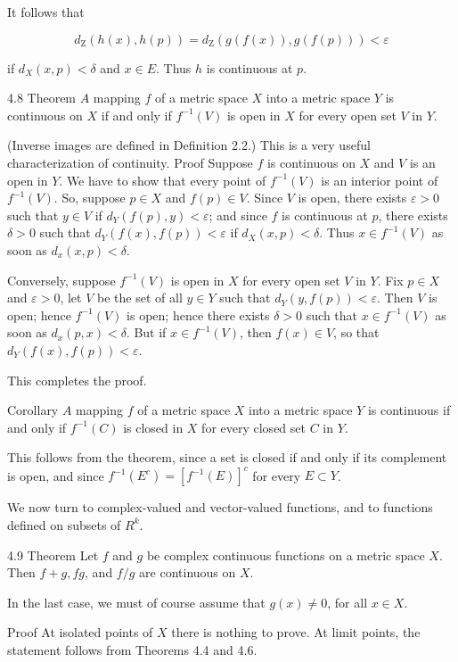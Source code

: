 \documentclass[10pt]{article}
\begin{document}
It follows that

$$
d_{\mathrm{Z}}(h(x), h(p))=d_{\mathrm{Z}}(g(f(x)), g(f(p)))<\varepsilon
$$

if $d_{X}(x, p)<\delta$ and $x \in E$. Thus $h$ is continuous at $p$.

4.8 Theorem $A$ mapping $f$ of a metric space $X$ into a metric space $Y$ is continuous on $X$ if and only if $f^{-1}(V)$ is open in $X$ for every open set $V$ in $Y$.

(Inverse images are defined in Definition 2.2.) This is a very useful characterization of continuity. Proof Suppose $f$ is continuous on $X$ and $V$ is an open in $Y$. We have to show that every point of $f^{-1}(V)$ is an interior point of $f^{-1}(V)$. So, suppose $p \in X$ and $f(p) \in V$. Since $V$ is open, there exists $\varepsilon>0$ such that $y \in V$ if $d_{Y}(f(p), y)<\varepsilon$; and since $f$ is continuous at $p$, there exists $\delta>0$ such that $d_{Y}(f(x), f(p))<\varepsilon$ if $d_{X}(x, p)<\delta$. Thus $x \in f^{-1}(V)$ as soon as $d_{x}(x, p)<\delta$.

Conversely, suppose $f^{-1}(V)$ is open in $X$ for every open set $V$ in $Y$. Fix $p \in X$ and $\varepsilon>0$, let $V$ be the set of all $y \in Y$ such that $d_{Y}(y, f(p))<\varepsilon$. Then $V$ is open; hence $f^{-1}(V)$ is open; hence there exists $\delta>0$ such that $x \in f^{-1}(V)$ as soon as $d_{x}(p, x)<\delta$. But if $x \in f^{-1}(V)$, then $f(x) \in V$, so that $d_{Y}(f(x), f(p))<\varepsilon$.

This completes the proof.

Corollary $A$ mapping $f$ of a metric space $X$ into a metric space $Y$ is continuous if and only if $f^{-1}(C)$ is closed in $X$ for every closed set $C$ in $Y$.

This follows from the theorem, since a set is closed if and only if its complement is open, and since $f^{-1}\left(E^{c}\right)=\left[f^{-1}(E)\right]^{c}$ for every $E \subset Y$.

We now turn to complex-valued and vector-valued functions, and to functions defined on subsets of $R^{k}$.

4.9 Theorem Let $f$ and $g$ be complex continuous functions on a metric space $X$. Then $f+g, f g$, and $f / g$ are continuous on $X$.

In the last case, we must of course assume that $g(x) \neq 0$, for all $x \in X$.

Proof At isolated points of $X$ there is nothing to prove. At limit points, the statement follows from Theorems 4.4 and 4.6.
\end{document}
